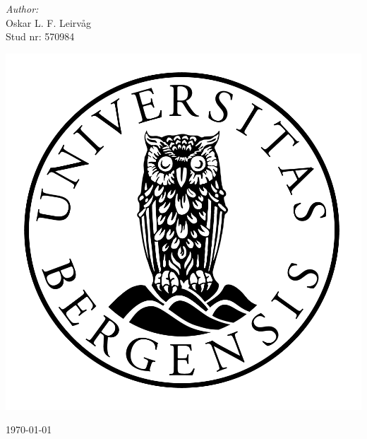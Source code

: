\documentclass[norsk, a4paper, 12pt,]{article}
\begin{document}
\begin{titlepage}
\Large \emph{Author:}\\
Oskar L. F. Leirvåg\\Stud nr: 570984
\\[2cm] %
\centerline{\includegraphics[scale=0.15]{figures/canvas}} %

{\large \today}\\[3cm] %


\vfill %

\end{titlepage}
\end{document}
